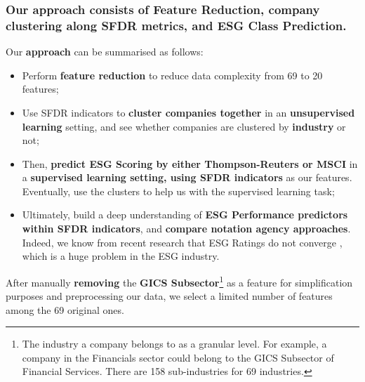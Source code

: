 \documentclass[12pt]{report}
\begin{document}
\subsubsection{Our approach consists of Feature Reduction, company clustering along SFDR metrics, and ESG Class Prediction.}

Our \textbf{approach} can be summarised as follows: 
\begin{itemize}
\item{Perform \textbf{feature reduction} to reduce data complexity from 69 to 20 features;}
\item{Use SFDR indicators to \textbf{cluster companies together} in an \textbf{unsupervised learning} setting}, and see whether companies are clustered by \textbf{industry} or not;
\item{Then, \textbf{predict ESG Scoring by either Thompson-Reuters or MSCI} in a \textbf{supervised learning setting, using SFDR indicators} as our features. Eventually, use the clusters to help us with the supervised learning task;}
\item{Ultimately, build a deep understanding of \textbf{ESG Performance predictors within SFDR indicators}, and \textbf{compare notation agency approaches}.} Indeed, we know from recent research that ESG Ratings do not converge \citep{notationdivergence}, which is a huge problem in the ESG industry. 
\end{itemize}
After manually \textbf{removing} the \textbf{GICS Subsector}\footnote{The industry a company belongs to as a granular level. For example, a company in the Financials sector could belong to the GICS Subsector of Financial Services. There are 158 sub-industries for 69 industries.} as a feature for simplification purposes and preprocessing our data, we select a limited number of features among the 69 original ones.\newline
\end{document}
